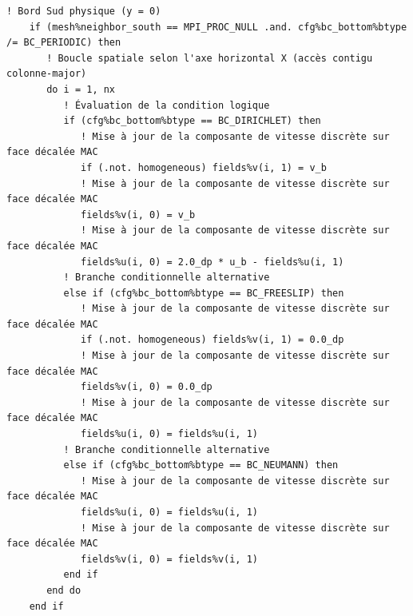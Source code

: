 \documentclass[10pt,a4paper,oneside]{book}
\begin{document}
\begin{lstlisting}[language={[95]Fortran}]
    ! Bord Sud physique (y = 0)
    if (mesh%neighbor_south == MPI_PROC_NULL .and. cfg%bc_bottom%btype /= BC_PERIODIC) then
       ! Boucle spatiale selon l'axe horizontal X (accès contigu colonne-major)
       do i = 1, nx
          ! Évaluation de la condition logique
          if (cfg%bc_bottom%btype == BC_DIRICHLET) then
             ! Mise à jour de la composante de vitesse discrète sur face décalée MAC
             if (.not. homogeneous) fields%v(i, 1) = v_b
             ! Mise à jour de la composante de vitesse discrète sur face décalée MAC
             fields%v(i, 0) = v_b
             ! Mise à jour de la composante de vitesse discrète sur face décalée MAC
             fields%u(i, 0) = 2.0_dp * u_b - fields%u(i, 1)
          ! Branche conditionnelle alternative
          else if (cfg%bc_bottom%btype == BC_FREESLIP) then
             ! Mise à jour de la composante de vitesse discrète sur face décalée MAC
             if (.not. homogeneous) fields%v(i, 1) = 0.0_dp
             ! Mise à jour de la composante de vitesse discrète sur face décalée MAC
             fields%v(i, 0) = 0.0_dp
             ! Mise à jour de la composante de vitesse discrète sur face décalée MAC
             fields%u(i, 0) = fields%u(i, 1)
          ! Branche conditionnelle alternative
          else if (cfg%bc_bottom%btype == BC_NEUMANN) then
             ! Mise à jour de la composante de vitesse discrète sur face décalée MAC
             fields%u(i, 0) = fields%u(i, 1)
             ! Mise à jour de la composante de vitesse discrète sur face décalée MAC
             fields%v(i, 0) = fields%v(i, 1)
          end if
       end do
    end if


\end{lstlisting}
\end{document}
